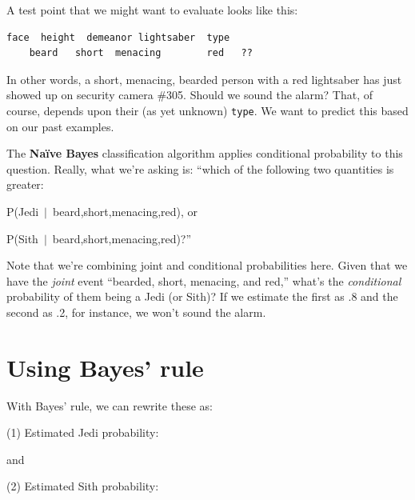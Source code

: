 A test point that we might want to evaluate looks like this:
\begin{Verbatim}[fontsize=\small,samepage=true,frame=leftline,framesep=5mm,framerule=1mm]
     face  height  demeanor lightsaber  type
    beard   short  menacing        red   ?? 
\end{Verbatim}


In other words, a short, menacing, bearded person with a red lightsaber has
just showed up on security camera \#305. Should we sound the alarm? That, of
course, depends upon their (as yet unknown) \texttt{type}. We want to predict
this based on our past examples.

\bigskip

The \textbf{Na\"{i}ve Bayes} classification algorithm applies conditional
probability to this question. Really, what we're asking is: ``which of the
following two quantities is greater:

\begin{compactenum}
\item P(Jedi\ $|$\ beard,short,menacing,red),  or
\item P(Sith\ $|$\ beard,short,menacing,red)?''
\end{compactenum}
 
Note that we're combining joint and conditional probabilities here. Given that
we have the \textit{joint} event ``bearded, short, menacing, and red,'' what's
the \textit{conditional} probability of them being a Jedi (or Sith)? If we
estimate the first as .8 and the second as .2, for instance, we won't sound the
alarm.

\section{Using Bayes' rule}


With Bayes' rule, we can rewrite these as:

\footnotesize
\begin{center}
(1) Estimated Jedi probability:

\end{center}
\normalsize

and
\footnotesize
\begin{center}
(2) Estimated Sith probability:

\end{center}
\normalsize

